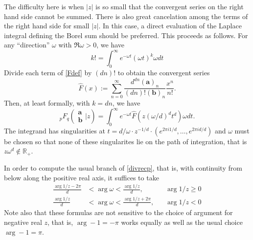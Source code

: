 \documentclass[12pt]{article}
\newcommand{\ee}[0] {e}
\numberwithin{equation}{section}
\newcommand{\FF}[6] {{}_{#1}{#2}_{#3} \left( \begin{array}{c} #4 \\ #5 \end{array} \Big| #6  \right)}
\begin{document}
The difficulty here is when $|z|$ is so small that the convergent series on the right hand side cannot be summed. There is also great cancelation among the terms of the right hand side for small $|z|$. In this case, a direct evaluation of the Laplace integral defining the Borel sum should be preferred. This proceeds
as follows. For any ``direction'' $\omega$ with $\Re \omega > 0$, we have
\begin{equation*}
k! = \int_0^{\infty} \ee^{-\omega t} (\omega t)^k \omega dt
\end{equation*}
Divide each term of \eqref{Fdef} by $(dn)!$ to obtain the convergent series
\begin{equation*}
\hat{F}(x) := \sum_{n=0}^{\infty} \frac{d^{d n}(\mathbf{a})_n}{(dn)!(\mathbf{b})_n} \frac{x^n}{n!}\text{.}
\end{equation*}
Then, at least formally, with $k = dn$, we have
\begin{equation*}
\FF{p}{F}{q}{\mathbf{a}}{\mathbf{b}}{z} = \int_{0}^{\infty} \ee^{-\omega t} \hat{F}(z(\omega/d)^d t^d) \omega dt \text{.}
\end{equation*}
The integrand has singularities at $t = d/\omega \cdot z^{-1/d} \cdot (\ee^{2\pi i 1/ d}, \dots, \ee^{2\pi i  d / d})$
and $\omega$ must be chosen so that none of these singularites lie on the path of integration, that is $z \omega^d \not \in \mathbb{R}_{+}$.

In order to compute the usual branch of \eqref{divrecp}, that is, with continuity from below along the positive real axis, it suffices to take
\begin{equation*}
\begin{alignedat}{3}
\frac{\arg 1/z - 2\pi}{d} &< \arg \omega < \frac{\arg 1/z}{d} \text{,} \quad & \arg 1/z \ge 0\\
\frac{\arg 1/z}{d} &< \arg \omega < \frac{\arg 1/z + 2\pi}{d} \text{,} \quad & \arg 1/z < 0
\end{alignedat}
\end{equation*}
Note also that these formulas are not sensitive to the choice of argument for negative real $z$, that is, $\arg -1 = -\pi$ works equally as well as the usual choice $\arg -1 = \pi$.
\end{document}

